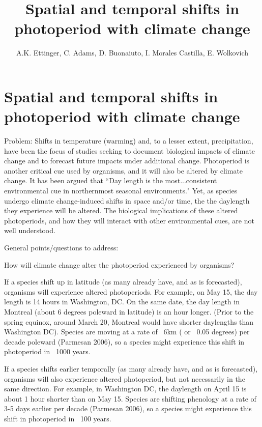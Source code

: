 \documentclass{article}
\begin{document}
 
\title{Spatial and temporal shifts in photoperiod with climate change} %

\author{A.K. Ettinger, C. Adams, D. Buonaiuto, I. Morales Castilla, E. Wolkovich}
\maketitle  %

\section* {Spatial and temporal shifts in photoperiod with climate change}
\par Problem: Shifts in temperature (warming) and, to a lesser extent, precipitation, have been the focus of studies seeking to document biological impacts of climate change and to forecast future impacts under additional change. Photoperiod is another critical cue used by organisms, and it will also be altered by climate change. It has been argued that “Day length is the most...consistent environmental cue in northernmost seasonal environments." Yet, as species undergo climate change-induced shifts in space and/or time, the the daylength they experience will be altered. The biological implications of these altered photoperiods, and how they will interact with other environmental cues, are not well understood.

General points/questions to address:

How will climate change alter the photoperiod experienced by organisms?

    If a species shift up in latitude (as many already have, and as is forecasted), organisms will experience altered photoperiods. For example, on May 15, the day length is 14 hours in Washington, DC. On the same date, the day length in Montreal (about 6 degrees poleward in latitude) is an hour longer. (Prior to the spring equinox, around March 20, Montreal would have shorter daylengths than Washington DC). Species are moving at a rate of ~6km ( or ~0.05 degrees) per decade poleward (Parmesan 2006), so a species might experience this shift in photoperiod in ~1000 years.

    If a species shifts earlier temporally (as many already have, and as is forecasted), organisms will also experience altered photoperiod, but not necessarily in the same direction. For example, in Washington DC, the daylength on April 15 is about 1 hour shorter than on May 15. Species are shifting phenology at a rate of 3-5 days earlier per decade (Parmesan 2006), so a species might experience this shift in photoperiod in ~100 years.
\end{document}
